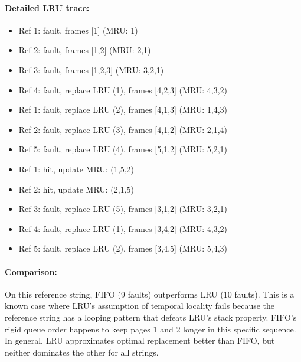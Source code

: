 \documentclass[11pt]{article}
\begin{document}
\begin{corrige}
\paragraph{Detailed LRU trace:}
\begin{itemize}
\item Ref 1: fault, frames [1] (MRU: 1)
\item Ref 2: fault, frames [1,2] (MRU: 2,1)
\item Ref 3: fault, frames [1,2,3] (MRU: 3,2,1)
\item Ref 4: fault, replace LRU (1), frames [4,2,3] (MRU: 4,3,2)
\item Ref 1: fault, replace LRU (2), frames [4,1,3] (MRU: 1,4,3)
\item Ref 2: fault, replace LRU (3), frames [4,1,2] (MRU: 2,1,4)
\item Ref 5: fault, replace LRU (4), frames [5,1,2] (MRU: 5,2,1)
\item Ref 1: hit, update MRU: (1,5,2)
\item Ref 2: hit, update MRU: (2,1,5)
\item Ref 3: fault, replace LRU (5), frames [3,1,2] (MRU: 3,2,1)
\item Ref 4: fault, replace LRU (1), frames [3,4,2] (MRU: 4,3,2)
\item Ref 5: fault, replace LRU (2), frames [3,4,5] (MRU: 5,4,3)
\end{itemize}

\paragraph{Comparison:} On this reference string, FIFO (9 faults) outperforms LRU (10 faults). This is a known case where LRU's assumption of temporal locality fails because the reference string has a looping pattern that defeats LRU's stack property. FIFO's rigid queue order happens to keep pages 1 and 2 longer in this specific sequence. In general, LRU approximates optimal replacement better than FIFO, but neither dominates the other for all strings.
\end{corrige}
\end{document}
